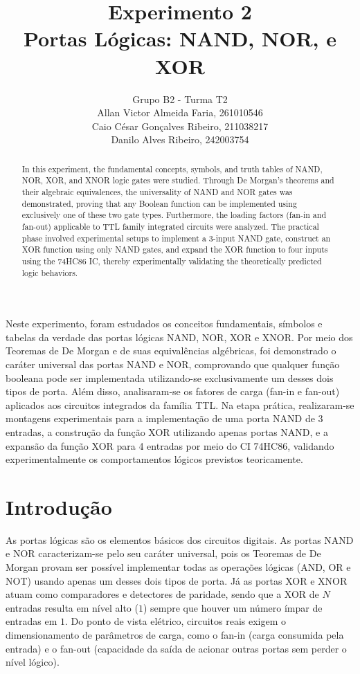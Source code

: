 \documentclass[12pt]{article}
\title{Experimento 2\\ 
Portas Lógicas: NAND, NOR, e XOR}
\author{Grupo B2 - Turma T2\\   
    Allan Victor Almeida Faria, 261010546\\
    Caio César Gonçalves Ribeiro,  211038217\\
    Danilo Alves Ribeiro,  242003754\\
}
\begin{document}
 
\maketitle

 \begin{abstract}
    In this experiment, the fundamental concepts, symbols, and truth tables of NAND, NOR, XOR, and XNOR logic gates were studied. Through De Morgan's theorems and their algebraic equivalences, the universality of NAND and NOR gates was demonstrated, proving that any Boolean function can be implemented using exclusively one of these two gate types. Furthermore, the loading factors (fan-in and fan-out) applicable to TTL family integrated circuits were analyzed. The practical phase involved experimental setups to implement a 3-input NAND gate, construct an XOR function using only NAND gates, and expand the XOR function to four inputs using the 74HC86 IC, thereby experimentally validating the theoretically predicted logic behaviors.
 \end{abstract}
 \begin{resumo} 
    Neste experimento, foram estudados os conceitos fundamentais, símbolos e tabelas da verdade das portas lógicas NAND, NOR, XOR e XNOR. Por meio dos Teoremas de De Morgan e de suas equivalências algébricas, foi demonstrado o caráter universal das portas NAND e NOR, comprovando que qualquer função booleana pode ser implementada utilizando-se exclusivamente um desses dois tipos de porta. Além disso, analisaram-se os fatores de carga (fan-in e fan-out) aplicados aos circuitos integrados da família TTL. Na etapa prática, realizaram-se montagens experimentais para a implementação de uma porta NAND de 3 entradas, a construção da função XOR utilizando apenas portas NAND, e a expansão da função XOR para 4 entradas por meio do CI 74HC86, validando experimentalmente os comportamentos lógicos previstos teoricamente.
 \end{resumo}


\section{Introdução}
\label{sec:Introducao}

As portas lógicas são os elementos básicos dos circuitos 
digitais. As portas NAND e NOR caracterizam-se pelo seu caráter universal, pois os Teoremas de De Morgan provam ser possível 
implementar todas as operações lógicas (AND, OR e NOT) usando apenas um desses dois tipos 
de porta. Já as portas XOR e XNOR atuam como comparadores e detectores de paridade, sendo que a XOR
 de $N$ entradas resulta em nível alto ($1$) sempre que houver um número ímpar de entradas em $1$. Do ponto de vista elétrico, 
 circuitos reais exigem o dimensionamento de parâmetros de carga, como o fan-in (carga consumida pela entrada) 
 e o fan-out (capacidade da saída de acionar outras portas sem perder o nível lógico).
\end{document}
